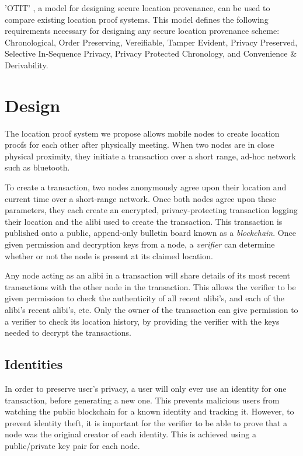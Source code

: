 \documentclass[12pt]{article}
\begin{document}
'OTIT' \cite{otit}, a model for designing secure location provenance, can be used to compare existing location proof systems. This model defines the following requirements necessary for designing any secure location provenance scheme: Chronological, Order Preserving, Vereifiable, Tamper Evident, Privacy Preserved, Selective In-Sequence Privacy, Privacy Protected Chronology, and Convenience \& Derivability.

\newpage
\section{Design}
The location proof system we propose allows mobile nodes to create location proofs for each other after physically meeting. When two nodes are in close physical proximity, they initiate a transaction over a short range, ad-hoc network such as bluetooth.

To create a transaction, two nodes anonymously agree upon their location and current time over a short-range network. Once both nodes agree upon these parameters, they each create an encrypted, privacy-protecting transaction logging their location and the alibi used to create the transaction. This transaction is published onto a public, append-only bulletin board known as a \textit{blockchain}. Once given permission and decryption keys from a node, a \textit{verifier} can determine whether or not the node is present at its claimed location.

Any node acting as an alibi in a transaction will share details of its most recent transactions with the other node in the transaction. This allows the verifier to be given permission to check the authenticity of all recent alibi's, and each of the alibi's recent alibi's, etc. Only the owner of the transaction can give permission to a verifier to check its location history, by providing the verifier with the keys needed to decrypt the transactions.

\subsection{Identities}
In order to preserve user's privacy, a user will only ever use an identity for one transaction, before generating a new one. This prevents malicious users from watching the public blockchain for a known identity and tracking it. However, to prevent identity theft, it is important for the verifier to be able to prove that a node was the original creator of each identity. This is achieved using a public/private key pair for each node.
\end{document}
